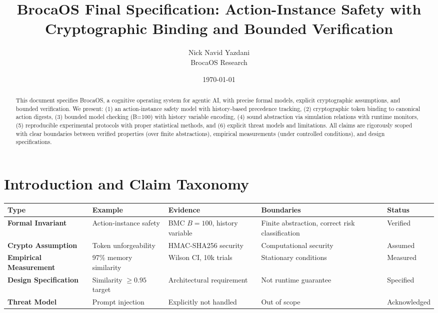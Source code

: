 \documentclass[12pt]{article}
\title{BrocaOS Final Specification: Action-Instance Safety with Cryptographic Binding and Bounded Verification}
\author{Nick Navid Yazdani\\BrocaOS Research}
\date{\today}
\begin{document}
\maketitle

\begin{abstract}
This document specifies BrocaOS, a cognitive operating system for agentic AI, with precise formal models, explicit cryptographic assumptions, and bounded verification. We present: (1) an action-instance safety model with history-based precedence tracking, (2) cryptographic token binding to canonical action digests, (3) bounded model checking (B=100) with history variable encoding, (4) sound abstraction via simulation relations with runtime monitors, (5) reproducible experimental protocols with proper statistical methods, and (6) explicit threat models and limitations. All claims are rigorously scoped with clear boundaries between verified properties (over finite abstractions), empirical measurements (under controlled conditions), and design specifications.
\end{abstract}

\section{Introduction and Claim Taxonomy}

\begin{center}
\small
\begin{tabular}{@{}p{}p{}p{}p{}p{}@{}}
\toprule
\textbf{Type} & \textbf{Example} & \textbf{Evidence} & \textbf{Boundaries} & \textbf{Status} \\
\midrule
\textbf{Formal Invariant} & Action-instance safety & BMC $B=100$, history variable & Finite abstraction, correct risk classification & Verified \\
\textbf{Crypto Assumption} & Token unforgeability & HMAC-SHA256 security & Computational security & Assumed \\
\textbf{Empirical Measurement} & 97\% memory similarity & Wilson CI, 10k trials & Stationary conditions & Measured \\
\textbf{Design Specification} & Similarity $\geq 0.95$ target & Architectural requirement & Not runtime guarantee & Specified \\
\textbf{Threat Model} & Prompt injection & Explicitly not handled & Out of scope & Acknowledged \\
\bottomrule
\end{tabular}
\end{center}
\end{document}

